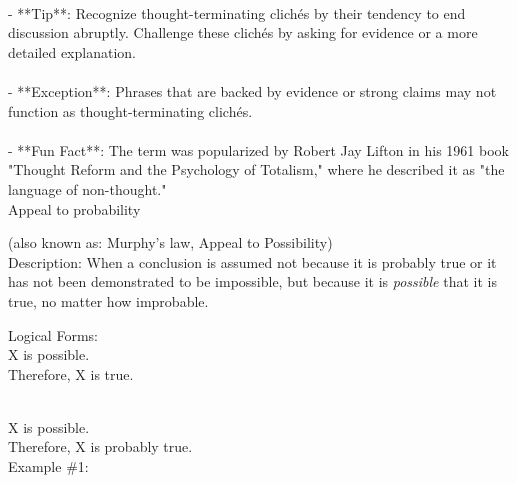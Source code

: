 \documentclass[a4paper,12pt,single,pdftex]{scrartcl}
\begin{document}
    
      
    \\

    
      - **Tip**: Recognize thought-terminating clichés by their tendency to end discussion abruptly. Challenge these clichés by asking for evidence or a more detailed explanation.
    \\

    
      
    \\

    
      - **Exception**: Phrases that are backed by evidence or strong claims may not function as thought-terminating clichés.
    \\

    
      
    \\

    
      - **Fun Fact**: The term was popularized by Robert Jay Lifton in his 1961 book "Thought Reform and the Psychology of Totalism," where he described it as "the language of non-thought."
    \\

  

Appeal to probability
    
      (also known as: Murphy's law, Appeal to Possibility)
    \\

  
    Description: When a conclusion is assumed not because it is probably true or it has not been demonstrated to be impossible, but because it is {\it possible}  that it is true, no matter how improbable.

    
      Logical Forms:
    \\

    
      X is possible.
    \\

    
      Therefore, X is true.
    \\

    
       \newline

       \newline

      
    \\

    
      X is possible.
    \\

    
      Therefore, X is probably true.
    \\

    
      Example \#1:
    \\
\end{document}
